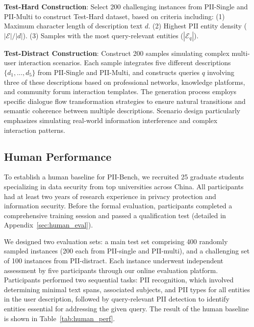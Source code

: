 \textbf{Test-Hard Construction}:
Select 200 challenging instances from PII-Single and PII-Multi to construct Test-Hard dataset, based on criteria including:
(1) Maximum character length of description text $d$.
(2) Highest PII entity density ($|\mathcal{E}|/|d|$).
(3) Samples with the most query-relevant entities ($|\mathcal{E}_q|$).

\textbf{Test-Distract Construction}:
Construct 200 samples simulating complex multi-user interaction scenarios.
Each sample integrates five different descriptions $\{d_1,...,d_5\}$ from PII-Single and PII-Multi, and constructs queries $q$ involving three of these descriptions based on professional networks, knowledge platforms, and community forum interaction templates.
The generation process employs specific dialogue flow transformation strategies to ensure natural transitions and semantic coherence between multiple descriptions.
Scenario design particularly emphasizes simulating real-world information interference and complex interaction patterns.

\subsection{Human Performance}
To establish a human baseline for PII-Bench, we recruited 25 graduate students specializing in data security from top universities across China. 
All participants had at least two years of research experience in privacy protection and information security. 
Before the formal evaluation, participants completed a comprehensive training session and passed a qualification test (detailed in Appendix~\ref{sec:human_eval}).

We designed two evaluation sets: a main test set comprising 400 randomly sampled instances (200 each from PII-single and PII-multi), and a challenging set of 100 instances from PII-distract. 
Each instance underwent independent assessment by five participants through our online evaluation platform. 
Participants performed two sequential tasks: 
PII recognition, which involved determining minimal text spans, associated subjects, and PII types for all entities in the user description, followed by query-relevant PII detection to identify entities essential for addressing the given query. 
The result of the human baseline is shown in Table~\ref{tab:human_perf}.

